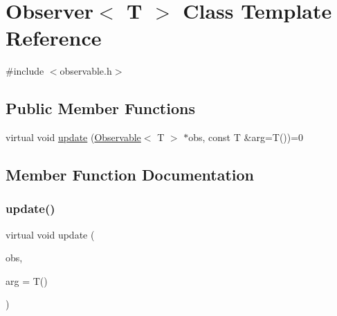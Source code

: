 \hypertarget{classObserver}{}\section{Observer$<$ T $>$ Class Template Reference}
\label{classObserver}


{\ttfamily \#include $<$observable.\+h$>$}

\subsection*{Public Member Functions}
\begin{DoxyCompactItemize}
\item 
virtual void \mbox{\hyperlink{classObserver_a8800f4bd3e48ece6f15db487ebad3712}{update}} (\mbox{\hyperlink{classObservable}{Observable}}$<$ T $>$ $\ast$obs, const T \&arg=T())=0
\end{DoxyCompactItemize}


\subsection{Member Function Documentation}
\mbox{\label{classObserver_a8800f4bd3e48ece6f15db487ebad3712}} 
\subsubsection{\texorpdfstring{update()}{update()}}
{\footnotesize\ttfamily virtual void update (\begin{DoxyParamCaption}\item[{\mbox{\hyperlink{classObservable}{Observable}}$<$ T $>$ $\ast$}]{obs,  }\item[{const T \&}]{arg = {\ttfamily T()} }\end{DoxyParamCaption})\hspace{0.3cm}{\ttfamily [pure virtual]}}

